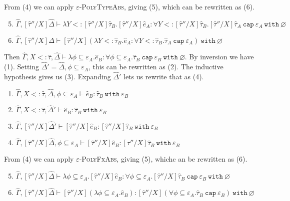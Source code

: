 \documentclass{llncs}
\newcommand{\keywadj}[1]{\mathtt{#1}}
\newcommand{\keyw}[1]{\keywadj{#1}~}
\newcommand{\kw}[1]{\keyw{ #1 }}
\begin{document}
From (4) we can apply \textsc{$\varepsilon$-PolyTypeAbs}, giving (5), which can be rewritten as (6).

\begin{enumerate}
	\setcounter{enumi}{4}
	\item  $\hat \Gamma, [\hat \tau''/X]\hat \Delta \vdash \lambda Y <: [\hat \tau''/X]\hat \tau_B. [\hat \tau''/X]\hat e_A: \forall Y <: [\hat \tau''/X]\hat \tau_B. [\hat \tau''/X]\hat \tau_A~\kw{cap} \varepsilon_A~\kw{with} \varnothing$
	\item $\hat \Gamma, [\hat \tau''/X] \Delta \vdash [\hat \tau''/X](\lambda Y <: \hat \tau_B. \hat e_A: \forall Y <: \hat \tau_B. \hat \tau_A~\kw{cap} \varepsilon_A)~\kw{with} \varnothing$
\end{enumerate}

 Then $\hat \Gamma, X <: \hat \tau, \hat \Delta \vdash \lambda \phi \subseteq \varepsilon_A. \hat e_B: \forall \phi \subseteq \varepsilon_A. \hat \tau_B~\kw{cap} \varepsilon_B~\kw{with} \varnothing$. By inversion we have (1). Setting $\hat \Delta' = \hat \Delta, \phi \subseteq \varepsilon_A$, this can be rewritten as (2). The inductive hypothesis gives us (3). Expanding $\hat \Delta'$ lets us rewrite that as (4).

\begin{enumerate}
	\item $\hat \Gamma, X <: \hat \tau, \hat \Delta, \phi \subseteq \varepsilon_A \vdash \hat e_B: \hat \tau_B~\kw{with} \varepsilon_B$
	\item $\hat \Gamma, X <: \hat \tau, \hat \Delta' \vdash \hat e_B: \hat \tau_B~\kw{with} \varepsilon_B$
	\item $\hat \Gamma, [\hat \tau''/X]\hat \Delta' \vdash [\hat \tau''/X]\hat e_B: [\hat \tau''/X]\hat \tau_B~\kw{with} \varepsilon_B$
	\item $\hat \Gamma, [\hat \tau''/X]\hat \Delta, \phi \subseteq \varepsilon_A \vdash [\hat \tau''/X]\hat e_B: [\hat \tau''/X]\hat \tau_B~\kw{with} \varepsilon_B$
\end{enumerate}

From (4) we can apply \textsc{$\varepsilon$-PolyFxAbs}, giving (5), whichc an be rewritten as (6).

\begin{enumerate}
	
	\setcounter{enumi}{4}
	\item $\hat \Gamma, [\hat \tau''/X]\hat \Delta \vdash \lambda \phi \subseteq \varepsilon_A. [\hat \tau''/X]\hat e_B: \forall \phi \subseteq \varepsilon_A. [\hat \tau''/X]\hat \tau_B~\kw{cap} \varepsilon_B~\kw{with} \varnothing$
	\item $\hat \Gamma, [\hat \tau''/X]\hat \Delta \vdash [\hat \tau''/X](\lambda \phi \subseteq \varepsilon_A. \hat e_B): [\hat \tau''/X](\forall \phi \subseteq \varepsilon_A. \hat \tau_B~\kw{cap} \varepsilon_B)~\kw{with} \varnothing$
\end{enumerate}
\end{document}
